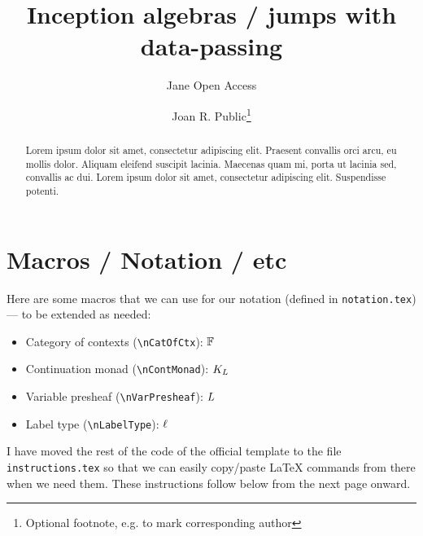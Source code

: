 \documentclass[a4paper,UKenglish,cleveref, autoref, thm-restate]{lipics-v2021}
\title{Inception algebras / jumps with data-passing} %
\author{Jane {Open Access}}{Dummy University Computing Laboratory, [optional: Address], Country \and My second affiliation, Country \and \url{http://www.myhomepage.edu} }{johnqpublic@dummyuni.org}{https://orcid.org/0000-0002-1825-0097}{(Optional) author-specific funding acknowledgements}%
\author{Joan R. Public\footnote{Optional footnote, e.g. to mark corresponding author}}{Department of Informatics, Dummy College, [optional: Address], Country}{joanrpublic@dummycollege.org}{[orcid]}{[funding]}
\begin{document}
\maketitle

\begin{abstract}
Lorem ipsum dolor sit amet, consectetur adipiscing elit. Praesent convallis orci arcu, eu mollis dolor. Aliquam eleifend suscipit lacinia. Maecenas quam mi, porta ut lacinia sed, convallis ac dui. Lorem ipsum dolor sit amet, consectetur adipiscing elit. Suspendisse potenti. 
\end{abstract}

\section{Macros / Notation / etc}
Here are some macros that we can use for our notation (defined in \verb+notation.tex+) --- to be extended as needed:

\begin{itemize}
\item Category of contexts (\verb+\nCatOfCtx+): $\mathbb{F}$
\item Continuation monad (\verb+\nContMonad+): $K_L$
\item Variable presheaf (\verb+\nVarPresheaf+): $L$
\item Label type (\verb+\nLabelType+): $\ell$
\end{itemize}

I have moved the rest of the code of the official template to the file \verb+instructions.tex+ so that we can easily copy/paste \LaTeX{} commands from there when we need them.
These instructions follow below from the next page onward.


\clearpage

\end{document}
